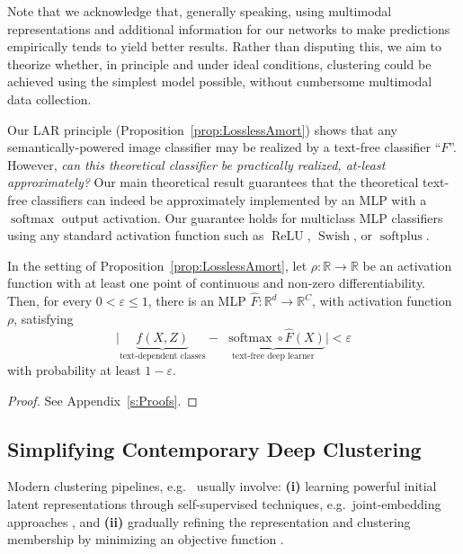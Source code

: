 Note that we acknowledge that, generally speaking, using multimodal representations and additional information for our networks to make predictions empirically tends to yield better results. Rather than disputing this, we aim to theorize whether, in principle and under ideal conditions, clustering could be achieved using the simplest model possible, without cumbersome multimodal data collection.


Our LAR principle (Proposition~\ref{prop:LosslessAmort}) shows that any semantically-powered image classifier may be realized by a text-free classifier ``$F$''.  However, \textit{can this theoretical classifier be practically realized, at-least approximately?}
Our main theoretical result guarantees that the theoretical text-free classifiers can indeed be approximately implemented by an MLP with a $\operatorname{softmax}$ output activation.  Our guarantee holds for multiclass MLP classifiers using any standard activation function such as $\operatorname{ReLU}$, $\operatorname{Swish}$, or $\operatorname{softplus}$.

\begin{theorem}
\label{thrm:DCplus}
In the setting of Proposition~\ref{prop:LosslessAmort}, let $\rho:\mathbb{R}\to \mathbb{R}$ be an activation function with at least one point of continuous and non-zero differentiability.  
Then, for every $0<\varepsilon\le 1$, there is an MLP $\hat{F}:\mathbb{R}^d\to \mathbb{R}^C$, with activation function $\rho$, satisfying
\begin{equation}
        \big|
            \underbrace{
                f(X,Z)
            }_{\text{text-dependent classes}}
            -
            \underbrace{
                \,\,
                \operatorname{softmax}\circ \hat{F}(X)
            }_{\text{text-free deep learner}}
        \big|
    <
        \varepsilon
\end{equation}
with probability at least $1-\varepsilon$.
\end{theorem}
\begin{proof}
See Appendix~\ref{s:Proofs}.
\end{proof}

\subsection{Simplifying Contemporary Deep Clustering}

Modern clustering pipelines, e.g.\ \cite{van2020scan,ding2023unsupervised} usually involve: \textbf{(i)} learning powerful initial latent representations through self-supervised techniques, e.g.\ joint-embedding approaches \cite{chen2020simple,he2020momentum}, and \textbf{(ii)} gradually refining the representation and clustering membership by minimizing an objective function \cite{caron2019deepclusteringunsupervisedlearning}. 

